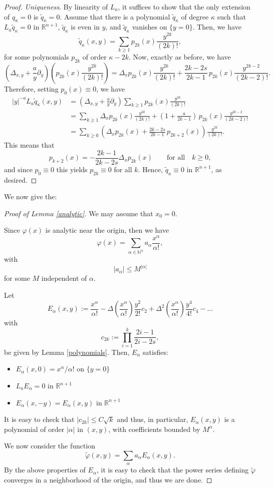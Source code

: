 \documentclass[11pt]{amsart}
\theoremstyle{plain}
\numberwithin{equation}{section}
\begin{document}
\begin{proof}
\emph{Uniqueness}. By linearity of $L_a$, it suffices to show that the only extension of $q_\kappa=0$ is $\tilde q_\kappa=0$.
Assume that there is a polynomial $\tilde q_\kappa$ of degree $\kappa$ such that $L_a\tilde q_\kappa=0$ in ${\mathbb R}^{n+1}$, $\tilde q_\kappa$ is even in $y$, and $\tilde q_\kappa$ vanishes on $\{y=0\}$.
Then, we have
\[\tilde q_\kappa(x,y)=\sum_{k\geq1} p_{2k}(x)\frac{y^{2k}}{(2k)!},\]
for some polynomials $p_{2k}$ of order $\kappa-2k$.
Now, exactly as before, we have
\[\left(\Delta_{x,y}+\frac{a}{y}\partial_y\right)\left(p_{2k}(x)\frac{y^{2k}}{(2k)!}\right)=\Delta_x p_{2k}(x)\frac{y^{2k}}{(2k)!}+\frac{2k-2s}{2k-1}\,p_{2k}(x)\frac{y^{2k-2}}{(2k-2)!}.\]
Therefore, setting $p_0(x)\equiv0$, we have
\[\begin{split}
|y|^{-a}L_a\tilde q_\kappa(x,y)&=
 \left(\Delta_{x,y}+\frac{a}{y}\partial_y\right)\sum_{k\geq1}p_{2k}(x)\frac{y^{2k}}{(2k)!}\\
&=\sum_{k\geq1}\Delta_x p_{2k}(x)\frac{y^{2k}}{(2k)!} +\left(1+\frac{a}{2k-1}\right)\,p_{2k}(x)\frac{y^{2k-2}}{(2k-2)!}\\
&=\sum_{k\geq0} \left(\Delta_x p_{2k}(x)+\frac{2k-2s}{2k-1}\,p_{2k+2}(x)\right)\frac{y^{2k}}{(2k)!}.
\end{split}\]
This means that
\[p_{k+2}(x)=-\frac{2k-1}{2k-2s}\Delta_x p_{2k}(x)\qquad\textrm{for all}\quad k\geq0,\]
and since $p_0\equiv0$ this yields $p_{2k}\equiv0$ for all $k$.
Hence, $\tilde q_\kappa\equiv0$ in ${\mathbb R}^{n+1}$, as desired.
\end{proof}

We now give the:

\begin{proof}[Proof of Lemma \ref{analytic}]
We may assume that $x_0=0$.

Since $\varphi(x)$ is analytic near the origin, then we have
\[\varphi(x)=\sum_{\alpha\in \mathbb N^n} a_\alpha \frac{x^\alpha}{\alpha!},\]
with
\[|a_\alpha|\leq M^{|\alpha|}\]
for some $M$ independent of $\alpha$.

Let
\[E_\alpha(x,y):=\frac{x^\alpha}{\alpha!}-\Delta\left(\frac{x^\alpha}{\alpha!}\right)\frac{y^2}{2!}c_2+ \Delta^2\left(\frac{x^\alpha}{\alpha!}\right)\frac{y^4}{4!}c_4-...\]
with
\[c_{2k}:=\prod_{i=1}^k \frac{2i-1}{2i-2s},\]
be given by Lemma \ref{polynomials}.
Then, $E_\alpha$ satisfies:
\begin{itemize}
\item $E_\alpha(x,0)=x^\alpha/\alpha!$ on $\{y=0\}$
\item $L_aE_\alpha=0$ in ${\mathbb R}^{n+1}$
\item $E_\alpha(x,-y)=E_\alpha(x,y)$ in ${\mathbb R}^{n+1}$
\end{itemize}
It is easy to check that $|c_{2k}|\leq C\sqrt{k}$ and thus, in particular, $E_\alpha(x,y)$ is a polynomial of order $|\alpha|$ in $(x,y)$, with coefficients bounded by $M^\alpha$.

We now consider the function
\[\tilde \varphi(x,y)=\sum_{\alpha} a_\alpha E_\alpha(x,y).\]
By the above properties of $E_\alpha$, it is easy to check that the power series defining $\tilde\varphi$ converges in a neighborhood of the origin, and thus we are done.
\end{proof}
\end{document}
